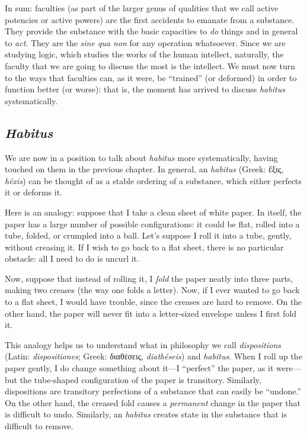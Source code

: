 \documentclass[
  12pt,
]{memoir}
\begin{document}
In sum: faculties (as part of the larger genus of qualities that we call
active potencies or active powers) are the first accidents to emanate
from a substance. They provide the substance with the basic capacities
to \emph{do} things and in general to \emph{act}. They are the
\emph{sine qua non} for any operation whatsoever. Since we are studying
logic, which studies the works of the human intellect, naturally, the
faculty that we are going to discuss the most is the intellect. We must
now turn to the ways that faculties can, as it were, be ``trained'' (or
deformed) in order to function better (or worse): that is, the moment
has arrived to discuss \emph{habitus} systematically.

\subsection{\texorpdfstring{\emph{Habitus}}{Habitus}}\label{habitus}

We are now in a position to talk about \emph{habitus} more
systematically, having touched on them in the previous chapter. In
general, an \emph{habitus} (Greek: ἕξις, \emph{héxis}) can be thought of
as a stable ordering of a substance, which either perfects it or deforms
it.

Here is an analogy: suppose that I take a clean sheet of white paper. In
itself, the paper has a large number of possible configurations: it
could be flat, rolled into a tube, folded, or crumpled into a ball.
Let's suppose I roll it into a tube, gently, without creasing it. If I
wish to go back to a flat sheet, there is no particular obstacle: all I
need to do is uncurl it.

Now, suppose that instead of rolling it, I \emph{fold} the paper neatly
into three parts, making two creases (the way one folds a letter). Now,
if I ever wanted to go back to a flat sheet, I would have trouble, since
the creases are hard to remove. On the other hand, the paper will never
fit into a letter-sized envelope unless I first fold it.

This analogy helps us to understand what in philosophy we call
\emph{dispositions} (Latin: \emph{dispositiones}; Greek: διαθέσεις,
\emph{diathéseis}) and \emph{habitus}. When I roll up the paper gently,
I do change something about it---I ``perfect'' the paper, as it
were---but the tube-shaped configuration of the paper is transitory.
Similarly, dispositions are transitory perfections of a substance that
can easily be ``undone.'' On the other hand, the creased fold causes a
\emph{permanent} change in the paper that is difficult to undo.
Similarly, an \emph{habitus} creates state in the substance that is
difficult to remove.
\end{document}
